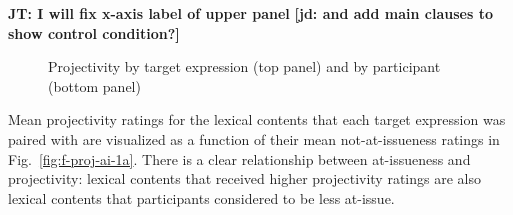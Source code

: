 \documentclass[11pt,fleqn]{article}
\newcommand{\6}{\mbox{$[\hspace*{-.6mm}[$}}
\newcommand{\9}{\mbox{$]\hspace*{-.6mm}]$}}
\newcommand{\figref}[1]{Fig.~\ref{#1}}
\newcommand{\jt}[1]{\textbf{\color{blue}JT: #1}}
\newcommand{\jd}[1]{\textbf{\color{Green}[jd: #1]}}
\begin{document}
\jt{I will fix x-axis label of upper panel} \jd{and add main clauses to show control condition?}

\begin{figure}[!h]
\centering


	

\caption{Projectivity by target expression (top panel) and by participant (bottom panel)}
\label{fig:f-proj-1a}
\end{figure}


Mean projectivity ratings for the lexical contents that each target expression was paired with are visualized as a function of their mean not-at-issueness ratings in \figref{fig:f-proj-ai-1a}. There is a clear relationship between at-issueness and projectivity: lexical contents that received higher projectivity ratings are also lexical contents that participants considered to be less at-issue. 
\end{document}
